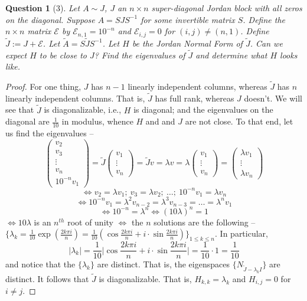\documentclass[11pt]{article}
\theoremstyle{quest}
\newtheorem*{question}{Question}
\begin{document}
\begin{question}[3]
Let $A \sim J$, $J$ an $n \times n$ super-diagonal Jordan block with all zeros on the diagonal. Suppose $A = SJS^{-1}$ for some invertible matrix $S$. Define the $n \times n$ matrix $\mathcal{E}$ by $\mathcal{E}_{n, 1} = 10^{-n}$ and $\mathcal{E}_{i, j} = 0$ for $(i, j) \ne (n, 1)$. Define $\tilde{J} := J + \mathcal{E}$. Let $\tilde{A} = S\tilde{J}S^{-1}$. Let $H$ be the Jordan Normal Form of $\tilde{J}$. Can we expect $H$ to be close to $J$? Find the eigenvalues of $\tilde{J}$ and determine what $H$ looks like.
\end{question}
\begin{proof}
For one thing, $J$ has $n-1$ linearly independent columns, whereas $\tilde{J}$ has $n$ linearly independent columns. That is, $\tilde{J}$ has full rank, whereas $J$ doesn't. We will see that $\tilde{J}$ is diagonalizable, i.e., $H$ is diagonal; and the eigenvalues on the diagonal are $\frac{1}{10}$ in modulus, whence $H$ and and $J$ are not close. To that end, let us find the eigenvalues --
$$\begin{pmatrix}
v_2 \\ v_3 \\ \vdots \\ v_n \\ 10^{-n}v_1
\end{pmatrix}= \tilde{J} \begin{pmatrix}
v_1 \\ \vdots \\ v_n
\end{pmatrix} = \tilde{J}v = \lambda v = \lambda \begin{pmatrix}
v_1 \\ \vdots \\ v_n
\end{pmatrix} = \begin{pmatrix}
\lambda v_1 \\ \vdots \\ \lambda v_n
\end{pmatrix}$$
$$\iff v_2 = \lambda v_1;\ v_3 = \lambda v_2;\ \ldots ;\ 10^{-n} v_1 = \lambda v_n$$
$$\iff 10^{-n} v_1 = \lambda^2 v_{n-2} = \lambda^3 v_{n-3} = \ldots = \lambda^n v_1$$
$$\iff 10^{-n} = \lambda^n \iff (10\lambda)^n = 1$$
$\iff 10\lambda$ is an $n^{th}$ root of unity $\iff$ the $n$ solutions are the following -- 
\\$\{\lambda_k = \frac{1}{10}\exp(\frac{2k\pi i}{n}) = \frac{1}{10}(\cos \frac{2k\pi i}{n} + i\cdot\sin \frac{2k\pi i}{n})\}_{1 \le k \le n}.$ In particular, $$|\lambda_k| = \frac{1}{10} \Big|\cos\frac{2k\pi i}{n} + i \cdot \sin \frac{2k\pi i}{n} \Big| = \frac{1}{10} \cdot 1 = \frac{1}{10}$$
and notice that the $\{\lambda_k\}$ are distinct. That is, the eigenspaces $\{N_{\tilde{J}-\lambda_k I}\}$ are distinct. It follows that $\tilde{J}$ is diagonalizable. That is, $H_{k,k} = \lambda_k$ and $H_{i, j} = 0$ for $i \ne j$.
\end{proof}
\end{document}
